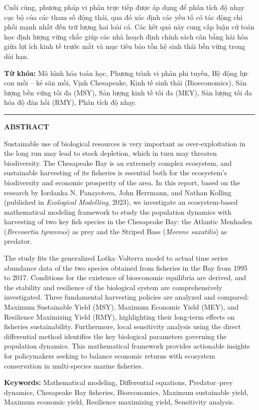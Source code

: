 Cuối cùng, phương pháp vi phân trực tiếp được áp dụng để phân tích độ nhạy cục bộ của các tham số động thái, qua đó xác định các yếu tố có tác động chi phối mạnh nhất đến trữ lượng hai loài cá. Các kết quả này cung cấp luận cứ toán học định lượng vững chắc giúp các nhà hoạch định chính sách cân bằng hài hòa giữa lợi ích kinh tế trước mắt và mục tiêu bảo tồn hệ sinh thái bền vững trong dài hạn.

\vspace{0.4cm}
\noindent \textbf{Từ khóa:} Mô hình hóa toán học, Phương trình vi phân phi tuyến, Hệ động lực con mồi -- kẻ săn mồi, Vịnh Chesapeake, Kinh tế sinh thái (Bioeconomics), Sản lượng bền vững tối đa (MSY), Sản lượng kinh tế tối đa (MEY), Sản lượng tối đa hóa độ đàn hồi (RMY), Phân tích độ nhạy.

\vspace{1cm}
\hrule
\vspace{0.8cm}

\begin{center}
  {\Large \bfseries ABSTRACT}
\end{center}
\vspace{0.5cm}

Sustainable use of biological resources is very important as over-exploitation in the long run may lead to stock depletion, which in turn may threaten biodiversity. The Chesapeake Bay is an extremely complex ecosystem, and sustainable harvesting of its fisheries is essential both for the ecosystem's biodiversity and economic prosperity of the area. In this report, based on the research by Iordanka N. Panayotova, John Herrmann, and Nathan Kolling (published in \textit{Ecological Modelling}, 2023), we investigate an ecosystem-based mathematical modeling framework to study the population dynamics with harvesting of two key fish species in the Chesapeake Bay: the Atlantic Menhaden (\textit{Brevoortia tyrannus}) as prey and the Striped Bass (\textit{Morone saxatilis}) as predator.

The study fits the generalized Lotka--Volterra model to actual time series abundance data of the two species obtained from fisheries in the Bay from 1995 to 2017. Conditions for the existence of bioeconomic equilibria are derived, and the stability and resilience of the biological system are comprehensively investigated. Three fundamental harvesting policies are analyzed and compared: Maximum Sustainable Yield (MSY), Maximum Economic Yield (MEY), and Resilience Maximizing Yield (RMY), highlighting their long-term effects on fisheries sustainability. Furthermore, local sensitivity analysis using the direct differential method identifies the key biological parameters governing the population dynamics. This mathematical framework provides actionable insights for policymakers seeking to balance economic returns with ecosystem conservation in multi-species marine fisheries.

\vspace{0.4cm}
\noindent \textbf{Keywords:} Mathematical modeling, Differential equations, Predator--prey dynamics, Chesapeake Bay fisheries, Bioeconomics, Maximum sustainable yield, Maximum economic yield, Resilience maximizing yield, Sensitivity analysis.
